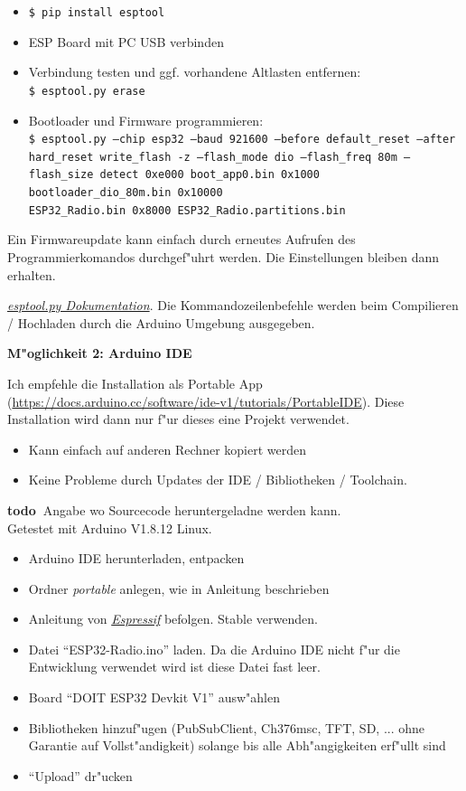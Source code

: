 \documentclass[ngerman,11pt,parskip=half] {scrartcl}
\newcommand {\todo} {\textbf{\color{red} todo\ }}
\begin{document}
\begin{itemize}
\item \texttt{\$ pip install esptool}
\item ESP Board mit PC USB verbinden
\item Verbindung testen und ggf. vorhandene Altlasten entfernen:\\
		\texttt{\$ esptool.py erase}
\item Bootloader und Firmware programmieren:\\
		\texttt{\$ esptool.py --chip esp32  --baud 921600 --before default\_reset --after hard\_reset write\_flash -z --flash\_mode dio --flash\_freq 80m --flash\_size detect 0xe000 boot\_app0.bin 0x1000 bootloader\_dio\_80m.bin 0x10000 \\ESP32\_Radio.bin 0x8000 ESP32\_Radio.partitions.bin}
\end{itemize}

Ein Firmwareupdate kann einfach durch erneutes Aufrufen des Programmierkomandos durchgef"uhrt werden. Die Einstellungen bleiben dann erhalten.

\emph{\href{https://docs.espressif.com/projects/esptool/en/latest/esp32s3/esptool/index.html}{esptool.py Dokumentation}}. Die Kommandozeilenbefehle werden beim Compilieren / Hochladen durch die Arduino Umgebung ausgegeben.

\textbf{M"oglichkeit 2: Arduino IDE}

Ich empfehle die Installation als Portable App (\url{https://docs.arduino.cc/software/ide-v1/tutorials/PortableIDE}). Diese Installation wird dann nur f"ur dieses eine Projekt verwendet.
\begin{itemize}
\item Kann einfach auf anderen Rechner kopiert werden
\item Keine Probleme durch Updates der IDE / Bibliotheken / Toolchain.
\end{itemize}

\todo Angabe wo Sourcecode heruntergeladne werden kann.\\
Getestet mit Arduino V1.8.12 Linux.

\begin{itemize}
\item Arduino IDE herunterladen, entpacken
\item Ordner \emph{portable} anlegen, wie in Anleitung beschrieben
\item Anleitung von \emph{\href{https://docs.espressif.com/projects/arduino-esp32/en/latest/installing.html}{Espressif}} befolgen. Stable verwenden.
\item Datei "`ESP32-Radio.ino"' laden. Da die Arduino IDE nicht f"ur die Entwicklung verwendet wird ist diese Datei fast leer.
\item Board "`DOIT ESP32 Devkit V1"' ausw"ahlen
\item Bibliotheken hinzuf"ugen (PubSubClient, Ch376msc, TFT, SD, ... ohne Garantie auf Vollst"andigkeit) solange bis alle Abh"angigkeiten erf"ullt sind
\item "`Upload"' dr"ucken
\end{itemize}
\end{document}
